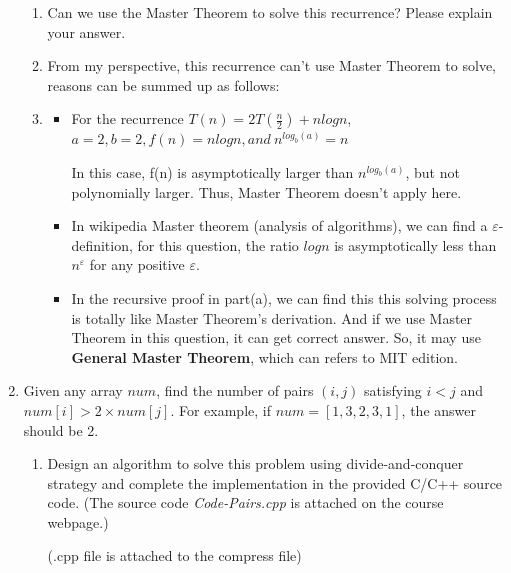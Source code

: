 \documentclass[12pt,a4paper]{article}
\makeatletter
\newtheorem*{solution}{Solution}
\theoremstyle{definition}
\renewenvironment{solution}[1][Solution] {\par\pushQED{\qed}\normalfont\topsep6\p@\@plus6\p@\relax\trivlist\item[\hskip\labelsep\bfseries#1\@addpunct{.}]\ignorespaces}{\popQED\endtrivlist\@endpefalse} \makeatother
\makeatother
\begin{document}
\begin{enumerate}
\begin{enumerate}
        \item
        Can we use the Master Theorem to solve this recurrence? Please explain your answer.
        \begin{solution}
        \renewcommand{\qedsymbol}{}
            From my perspective, this recurrence can't use Master Theorem to solve, reasons can be summed up as follows: 
            \item
            \begin{itemize}
            \item For the recurrence $T(n)=2T(\frac{n}{2})+nlogn$, $a=2,b=2,f(n)=nlogn,and\ n^{log_b(a)}=n$\par
            In this case, f(n) is asymptotically larger than $n^{log_b(a)}$, but not polynomially larger. Thus, Master Theorem doesn't apply here.
            \item In wikipedia Master theorem (analysis of algorithms), we can find a $\varepsilon$-definition, for this question, the ratio $logn$ is asymptotically less than $n^{\varepsilon}$ for any positive $\varepsilon$.
            \item In the recursive proof in part(a), we can find this this solving process is totally like Master Theorem's derivation. And if we use Master Theorem in this question, it can get correct answer.
            So, it may use \textbf{General Master Theorem}, which can refers to MIT edition.
            \end{itemize}
            
        \end{solution}

    \end{enumerate}

    \item
    Given any array $num$, find the number of pairs $(i, j)$ satisfying $i < j$ and $num[i] > 2 \times num[j]$. For example, if $num=[1,3,2,3,1]$, the answer should be 2.
    \begin{enumerate}
        \item
         Design an algorithm to solve this problem using divide-and-conquer strategy and complete the implementation in the provided C/C++ source code. {\color{blue}(The source code \emph{Code-Pairs.cpp} is attached on the course webpage.)}\par
         {\color{red}(.cpp file is attached to the compress file)}


\end{enumerate}
\end{enumerate}
\end{document}
